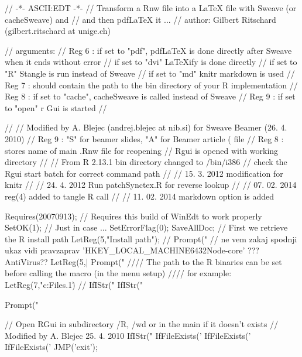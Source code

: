 // -*- ASCII:EDT -*-
// Transform a Rnw file into a LaTeX file with Sweave (or cacheSweave) and
// and then pdfLaTeX it ...
// author: Gilbert Ritschard (gilbert.ritschard at unige.ch)


// arguments:
// Reg 6 : if set to "pdf", pdfLaTeX is done directly after Sweave when it ends without error
//         if set to "dvi"  LaTeXify is done directly
//         if set to "R" Stangle is run instead of Sweave
//         if set to "md" knitr markdown is used
// Reg 7 : should contain the path to the bin directory of your R implementation
// Reg 8 : if set to "cache", cacheSweave is called instead of Sweave
// Reg 9 : if set to "open" r Gui is started
//

//
// Modified by A. Blejec (andrej.blejec at nib.si) for Sweave Beamer (26. 4. 2010)
// Reg 9 : "S" for beamer slides, "A" for Beamer article ( file %
// Reg 8 : stores name of main .Rnw file for reopening
// Rgui is opened with working directory %
//
// From R 2.13.1 bin directory changed to /bin/i386
// check the Rgui start batch for correct command path
//
// 15. 3. 2012 modification for knitr
//
// 24. 4. 2012 Run patchSynctex.R for reverse lookup
//
// 07. 02. 2014 reg(4) added to tangle R call
//
// 11. 02. 2014 markdown option is added


Requires(20070913); // Requires this build of WinEdt to work properly
SetOK(1);  // Just in case ...
SetErrorFlag(0);
SaveAllDoc;
// First we retrieve the R install path
LetReg(5,"Install path");
// Prompt("%
// ne vem zakaj spodnji ukaz vidi pravzaprav 'HKEY_LOCAL_MACHINE\SOFTWARE\Wow6432Node\R-core\R' ??? AntiVirus??
LetReg(5,|%
 Prompt("%
  //// The path to the R binaries can be set before calling the macro (in the menu setup)
  //// for example: LetReg(7,"c:\Program Files\R{}.1\bin\")
// IfIStr("%
IfIStr("%

 Prompt("%

// Open RGui in subdirectory /R, /wd or in the main if it doesn't exists
// Modified by A. Blejec 25. 4. 2010
IfIStr("%
    IfFileExists('%
    IfFileExists('%
    IfFileExists('%
JMP('exit');

